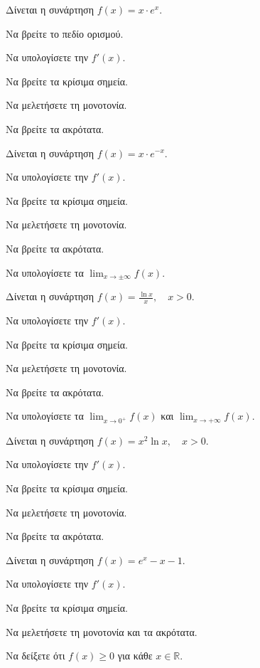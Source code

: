 \documentclass[11pt,a4paper,modern]{FFExercises}
\begin{document}
\askhsh
Δίνεται η συνάρτηση $f(x) = x \cdot e^x$.
\begin{alist}
    \item Να βρείτε το πεδίο ορισμού.
    \item Να υπολογίσετε την $f'(x)$.
    \item Να βρείτε τα κρίσιμα σημεία.
    \item Να μελετήσετε τη μονοτονία.
    \item Να βρείτε τα ακρότατα.
\end{alist}

\askhsh
Δίνεται η συνάρτηση $f(x) = x \cdot e^{-x}$.
\begin{alist}
    \item Να υπολογίσετε την $f'(x)$.
    \item Να βρείτε τα κρίσιμα σημεία.
    \item Να μελετήσετε τη μονοτονία.
    \item Να βρείτε τα ακρότατα.
    \item Να υπολογίσετε τα $\lim_{x \to \pm\infty} f(x)$.
\end{alist}

\askhsh
Δίνεται η συνάρτηση $f(x) = \frac{\ln x}{x}, \quad x > 0$.
\begin{alist}
    \item Να υπολογίσετε την $f'(x)$.
    \item Να βρείτε τα κρίσιμα σημεία.
    \item Να μελετήσετε τη μονοτονία.
    \item Να βρείτε τα ακρότατα.
    \item Να υπολογίσετε τα $\lim_{x \to 0^+} f(x)$ και $\lim_{x \to +\infty} f(x)$.
\end{alist}

\askhsh
Δίνεται η συνάρτηση $f(x) = x^2 \ln x, \quad x > 0$.
\begin{alist}
    \item Να υπολογίσετε την $f'(x)$.
    \item Να βρείτε τα κρίσιμα σημεία.
    \item Να μελετήσετε τη μονοτονία.
    \item Να βρείτε τα ακρότατα.
\end{alist}

\askhsh
Δίνεται η συνάρτηση $f(x) = e^x - x - 1$.
\begin{alist}
    \item Να υπολογίσετε την $f'(x)$.
    \item Να βρείτε τα κρίσιμα σημεία.
    \item Να μελετήσετε τη μονοτονία και τα ακρότατα.
    \item Να δείξετε ότι $f(x) \ge 0$ για κάθε $x \in \mathbb{R}$.
\end{alist}
\end{document}
